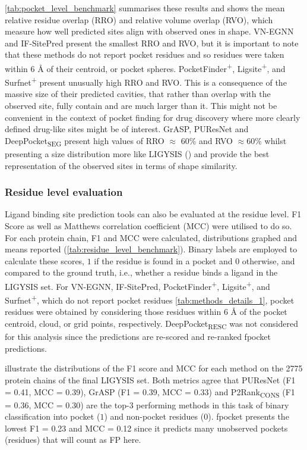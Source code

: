\autoref{tab:pocket_level_benchmark} summarises these results and shows the mean relative residue overlap (RRO) and relative volume overlap (RVO), which measure how well predicted sites align with observed ones in shape. VN-EGNN and IF-SitePred present the smallest RRO and RVO, but it is important to note that these methods do not report pocket residues and so residues were taken within 6 \AA{} of their centroid, or pocket spheres. PocketFinder\textsuperscript{+}, Ligsite\textsuperscript{+}, and Surfnet\textsuperscript{+} present unusually high RRO and RVO. This is a consequence of the massive size of their predicted cavities, that rather than overlap with the observed site, fully contain and are much larger than it. This might not be convenient in the context of pocket finding for drug discovery where more clearly defined drug-like sites might be of interest. GrASP, PUResNet and DeepPocket\textsubscript{SEG} present high values of RRO $\approx$ 60\% and RVO $\approx $60\% whilst presenting a size distribution more like LIGYSIS () and provide the best representation of the observed sites in terms of shape similarity.

\subsubsection{Residue level evaluation}

Ligand binding site prediction tools can also be evaluated at the residue level. F1 Score as well as Matthews correlation coefficient (MCC) were utilised to do so. For each protein chain, F1 and MCC were calculated, distributions graphed and means reported (\autoref{tab:residue_level_benchmark}). Binary labels are employed to calculate these scores, $1$ if the residue is found in a pocket and $0$ otherwise, and compared to the ground truth, i.e., whether a residue binds a ligand in the LIGYSIS set. For VN-EGNN, IF-SitePred, PocketFinder\textsuperscript{+}, Ligsite\textsuperscript{+}, and Surfnet\textsuperscript{+}, which do not report pocket residues \autoref{tab:methods_details_1}, pocket residues were obtained by considering those residues within 6 \AA{} of the pocket centroid, cloud, or grid points, respectively. DeepPocket\textsubscript{RESC} was not considered for this analysis since the predictions are re-scored and re-ranked fpocket predictions.

 illustrate the distributions of the F1 score and MCC for each method on the 2775 protein chains of the final LIGYSIS set. Both metrics agree that PUResNet (F1 = 0.41, MCC = 0.39), GrASP (F1 = 0.39, MCC = 0.33) and P2Rank\textsubscript{CONS} (F1 = 0.36, MCC = 0.30) are the top-3 performing methods in this task of binary classification into pocket ($1$) and non-pocket residues ($0$). fpocket presents the lowest F1 = 0.23 and MCC = 0.12 since it predicts many unobserved pockets (residues) that will count as FP here.

